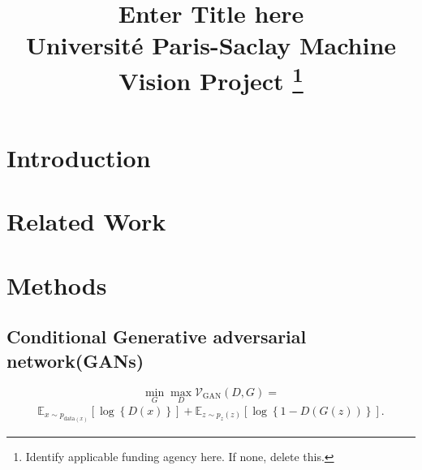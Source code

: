 \documentclass[conference]{IEEEtran}
\begin{document}
\title{Enter Title here\\
{\footnotesize Université Paris-Saclay Machine Vision Project}
\thanks{Identify applicable funding agency here. If none, delete this.}
}

\author{
}

\maketitle

\begin{abstract}

\end{abstract}

\begin{IEEEkeywords}

\end{IEEEkeywords}

\section{Introduction}


\section{Related Work}


\section{Methods}

\subsection{Conditional Generative adversarial network(GANs)}%


\begin{equation}
\min_{G}\max_{D}\mathcal V_{\text{GAN}}\left(D, G \right) = \end{equation}
\begin{align*}
 \mathbb E_{x \sim p_{\text{data}\left( x\right) }}\left[ \log \left\{ D\left( x \right) \right\} \right] + \mathbb E_{z\sim p_{z}\left( z\right)}\left[ \log\left\{ 1 - D\left( G\left( z\right) \right) \right\}\right].   
\end{align*}
\end{document}
